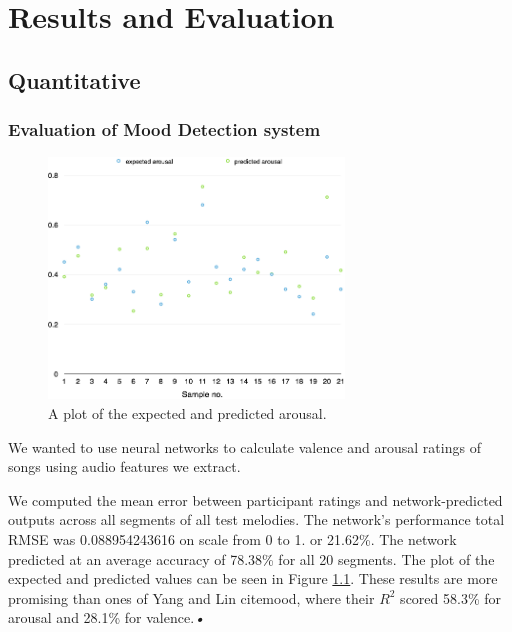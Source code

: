 
\chapter{Results and Evaluation} %

\label{Chapter6} %




\section{Quantitative}
\vspace{10pt}

\subsection{Evaluation of Mood Detection system}

\begin{figure}[t]
    \includegraphics[width=0.7\textwidth]{Figures/finalarousal}
    \centering

  \caption{A plot of the expected and predicted arousal.}
  \label{fig:anneval}
\end{figure}


We wanted to use neural networks to calculate valence and arousal ratings of songs using audio features we extract. 

We computed the mean error between participant ratings and network-predicted outputs across all segments of all test melodies. The network's performance total RMSE was 0.088954243616 on scale from 0 to 1. or 21.62\%.
The network predicted at an average accuracy of 78.38\% for all 20 segments. The plot of the expected and predicted values can be seen in Figure \ref{fig:anneval}.
These results are more promising than ones of Yang and Lin cite{mood}, where their $R^2$ scored 58.3\% for arousal and 28.1\% for valence.\textit{•}


